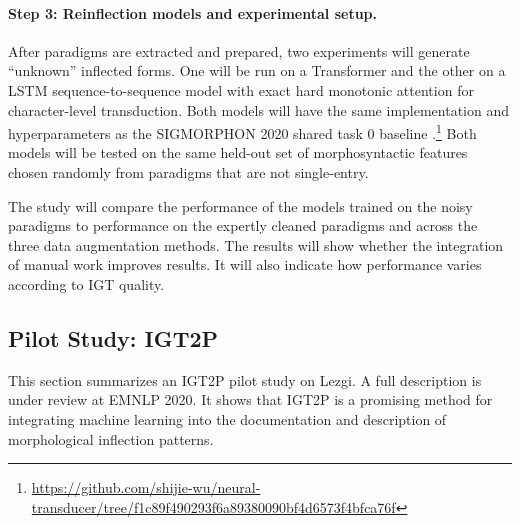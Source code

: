 \paragraph{Step 3: Reinflection models and experimental setup.}
After paradigms are extracted and prepared, two experiments will generate ``unknown'' inflected forms. One will be run on a Transformer and the other on a LSTM sequence-to-sequence model with exact hard monotonic attention for character-level transduction. Both models will have the same implementation and hyperparameters as the SIGMORPHON 2020 shared task 0 baseline \citep{vylomova2020sigmorphon}.\footnote{\url{https://github.com/shijie-wu/neural-transducer/tree/f1c89f490293f6a89380090bf4d6573f4bfca76f}} Both models will be tested on the same held-out set of morphosyntactic features chosen randomly from paradigms that are not single-entry. 

The study will compare the performance of the models trained on the noisy paradigms to performance on the expertly cleaned paradigms and across the three data augmentation methods. The results will show whether the integration of manual work improves results. It will also indicate how performance varies according to IGT quality.  

\subsection{Pilot Study: IGT2P}
\label{sec:pilotIGT2P}

This section summarizes an IGT2P pilot study on Lezgi. A full description is under review at EMNLP 2020. It shows that IGT2P is a promising method for integrating machine learning into the documentation and description of morphological inflection patterns.

